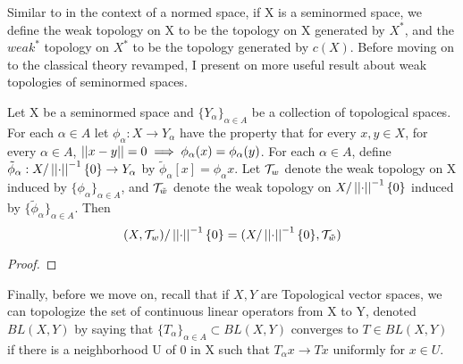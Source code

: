








 Similar to in the context of a normed space, if X is a seminormed space, we define the weak topology on X to be the topology on X generated by $X^*$, and the $weak^*$ topology on $X^*$ to be the topology generated by $c(X)$.
Before moving on to the classical theory revamped, I present on more useful result about weak topologies of seminormed spaces. 
\begin{prop}
    \label{prop:weakquotients}
    Let X be a seminormed space and $\{Y_\alpha\}_{\alpha \in A}$ be a collection of topological spaces. For each $\alpha \in A$ let $\phi_\alpha:X \to Y_\alpha$ have the property that for every $x,y \in X$, for every $\alpha \in A$, $\left|\left| x-y \right|\right|=0 \implies \phi_\alpha(x)=\phi_\alpha(y)$. 
    For each $\alpha \in A$, define $\tilde{\phi}_\alpha:X/\left|\left| \cdot \right|\right|^{-1}\{0\} \to Y_\alpha$ by
    $\tilde{\phi}_{\alpha}[x] = \phi_\alpha x$. Let $\mathcal{T}_w$ denote the weak topology on X induced by $\{\phi_\alpha\}_{\alpha \in A}$, and $\mathcal{T}_{\tilde{w}}$ denote the weak topology on $X/\left|\left| \cdot \right|\right|^{-1}\{0\}$ induced by $\{\tilde{\phi}_{\alpha}\}_{\alpha \in A}$. Then 
    \begin{equation}
        (X,\mathcal{T}_w)/\left|\left| \cdot \right|\right|^{-1}\{0\} = (X/\left|\left| \cdot \right|\right|^{-1}\{0\}, \mathcal{T}_{\tilde{w}})
    \end{equation}
    \begin{proof}
    \end{proof} 
\end{prop} 


Finally, before we move on, recall that if $X,Y$ are Topological vector spaces, we can topologize the set of continuous linear operators from X to Y, denoted $BL(X,Y)$ by saying that $\{T_\alpha\}_{\alpha \in A} \subset BL(X,Y)$ converges to $T \in BL(X,Y)$ if there is a neighborhood U of 0 in X such that $T_{\alpha}x \to Tx$ uniformly for $x \in U$. 
